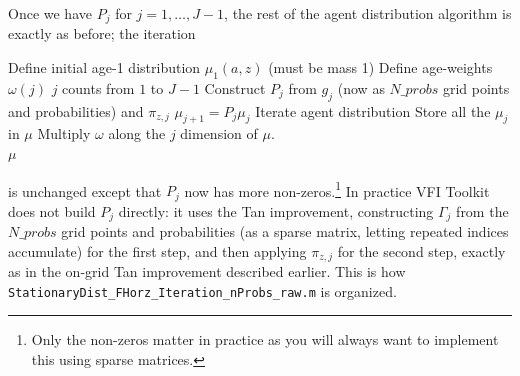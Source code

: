 Once we have $P_j$ for $j=1,\dots,J-1$, the rest of the agent distribution algorithm is exactly as before; the iteration
\begin{algorithmic}
 \State Define initial age-1 distribution $\mu_1(a,z)$ (must be mass 1)
 \State Define age-weights $\omega(j)$
 \For $j$ counts from $1$ to $J-1$
  \State Construct $P_j$ from $g_j$ (now as $N\_{}probs$ grid points and probabilities) and $\pi_{z,j}$
  \State $\mu_{j+1}=P_j \mu_j$ \Comment Iterate agent distribution
 \EndFor
 \State Store all the $\mu_j$ in $\mu$
  \State Multiply $\omega$ along the $j$ dimension of $\mu$.
 \\ \Return $\mu$
 \end{algorithmic}
is unchanged except that $P_j$ now has more non-zeros.\footnote{Only the non-zeros matter in practice as you will always want to implement this using sparse matrices.} In practice VFI Toolkit does not build $P_j$ directly: it uses the Tan improvement, constructing $\Gamma_j$ from the $N\_{}probs$ grid points and probabilities (as a sparse matrix, letting repeated indices accumulate) for the first step, and then applying $\pi_{z,j}$ for the second step, exactly as in the on-grid Tan improvement described earlier. This is how \texttt{StationaryDist\_{}FHorz\_{}Iteration\_{}nProbs\_{}raw.m} is organized.

